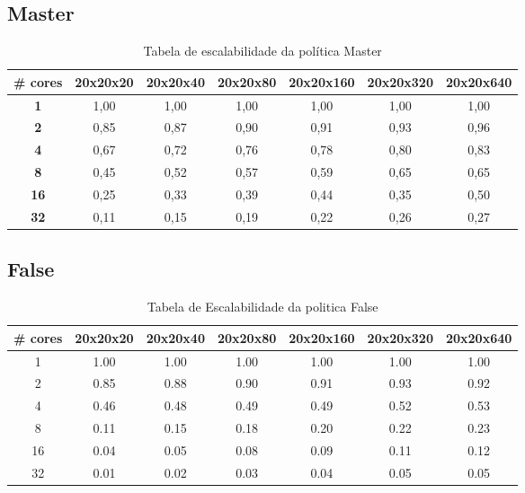 \documentclass[a4paper, 12pt]{article}
\begin{document}
	\vspace{5cm}
	
	\FloatBarrier
	
	\subsection{Master}
	\begin{table}[htbp]
		\centering
		\begin{tabular}{|c|c|c|c|c|c|c|}
			\hline
			\textbf{\# cores} & \textbf{20x20x20} & \textbf{20x20x40} & \textbf{20x20x80} & \textbf{20x20x160} & \textbf{20x20x320} & \textbf{20x20x640} \\
			\hline
			\textbf{1} & 1,00 & 1,00 & 1,00 & 1,00 & 1,00 & 1,00 \\
			\hline
			\textbf{2} & 0,85 & 0,87 & 0,90 & 0,91 & 0,93 & 0,96 \\
			\hline
			\textbf{4} & 0,67 & 0,72 & 0,76 & 0,78 & 0,80 & 0,83 \\
			\hline
			\textbf{8} & 0,45 & 0,52 & 0,57 & 0,59 & 0,65 & 0,65 \\
			\hline
			\textbf{16} & 0,25 & 0,33 & 0,39 & 0,44 & 0,35 & 0,50 \\
			\hline
			\textbf{32} & 0,11 & 0,15 & 0,19 & 0,22 & 0,26 & 0,27 \\
			\hline
		\end{tabular}
		\caption{Tabela de escalabilidade da política Master}
	\end{table}
	
	\FloatBarrier
	
	\subsection{False}
	\begin{table}[h]
		\centering
		
		\begin{tabular}{|c|c|c|c|c|c|c|}
			\hline
			\textbf{\# cores} & \textbf{20x20x20} & \textbf{20x20x40} & \textbf{20x20x80} & \textbf{20x20x160} & \textbf{20x20x320} & \textbf{20x20x640} \\
			\hline
			1 & 1.00 & 1.00 & 1.00 & 1.00 & 1.00 & 1.00 \\
			\hline
			2 & 0.85 & 0.88 & 0.90 & 0.91 & 0.93 & 0.92 \\
			\hline
			4 & 0.46 & 0.48 & 0.49 & 0.49 & 0.52 & 0.53 \\
			\hline
			8 & 0.11 & 0.15 & 0.18 & 0.20 & 0.22 & 0.23 \\
			\hline
			16 & 0.04 & 0.05 & 0.08 & 0.09 & 0.11 & 0.12 \\
			\hline
			32 & 0.01 & 0.02 & 0.03 & 0.04 & 0.05 & 0.05 \\
			\hline
		\end{tabular}
		\caption{Tabela de Escalabilidade da politica False}
	\end{table}
	
\end{document}
